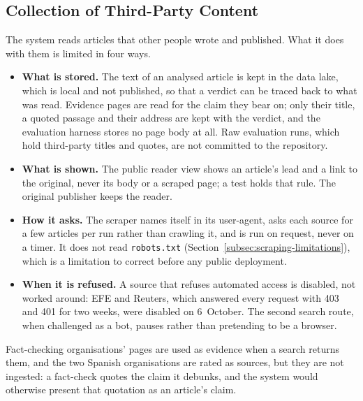 
\subsection{Collection of Third-Party Content}
\label{subsec:third-party-content}

The system reads articles that other people wrote and published. What
it does with them is limited in four ways.

\begin{itemize}
    \item \textbf{What is stored.} The text of an analysed article is
    kept in the data lake, which is local and not published, so that a
    verdict can be traced back to what was read. Evidence pages are
    read for the claim they bear on; only their title, a quoted passage
    and their address are kept with the verdict, and the evaluation
    harness stores no page body at all. Raw evaluation runs, which hold
    third-party titles and quotes, are not committed to the repository.
    \item \textbf{What is shown.} The public reader view shows an
    article's lead and a link to the original, never its body or a
    scraped page; a test holds that rule. The original publisher keeps
    the reader.
    \item \textbf{How it asks.} The scraper names itself in its
    user-agent, asks each source for a few articles per run rather than
    crawling it, and is run on request, never on a timer. It does not
    read \texttt{robots.txt} (Section~\ref{subsec:scraping-limitations}),
    which is a limitation to correct before any public deployment.
    \item \textbf{When it is refused.} A source that refuses automated
    access is disabled, not worked around: EFE and Reuters, which
    answered every request with 403 and 401 for two weeks, were disabled
    on 6~October. The second search route, when challenged as a bot,
    pauses rather than pretending to be a browser.
\end{itemize}

Fact-checking organisations' pages are used as evidence when a search
returns them, and the two Spanish organisations are rated as sources,
but they are not ingested: a fact-check quotes the claim it debunks, and
the system would otherwise present that quotation as an article's claim.

